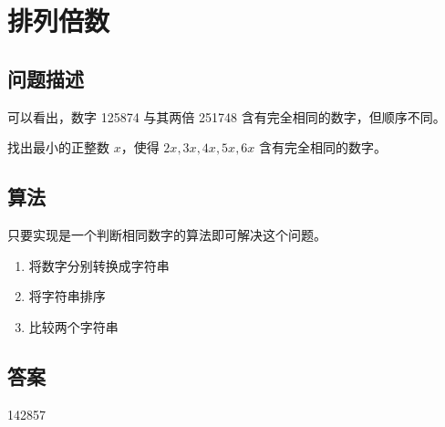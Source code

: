 \section{排列倍数}\label{sec:problem52}
\subsection{问题描述}
\begin{tcolorbox}
	可以看出，数字 125874 与其两倍 251748 含有完全相同的数字，但顺序不同。

	找出最小的正整数 $x$，使得 $2x, 3x, 4x, 5x, 6x$ 含有完全相同的数字。
\end{tcolorbox}

\subsection{算法}
只要实现是一个判断相同数字的算法即可解决这个问题。

\begin{enumerate}
	\item 将数字分别转换成字符串
	\item 将字符串排序
	\item 比较两个字符串
\end{enumerate}

\subsection{答案}
142857
